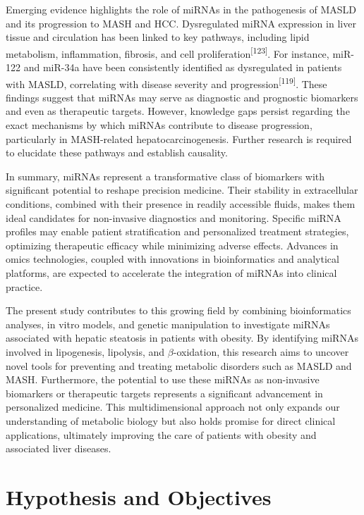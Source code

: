 \documentclass[
  11pt,
  letterpaper,
]{book}
\begin{document}
Emerging evidence highlights the role of miRNAs in the pathogenesis of
MASLD and its progression to MASH and HCC. Dysregulated miRNA expression
in liver tissue and circulation has been linked to key pathways,
including lipid metabolism, inflammation, fibrosis, and cell
proliferation\textsuperscript{{[}123{]}}. For instance, miR-122 and
miR-34a have been consistently identified as dysregulated in patients
with MASLD, correlating with disease severity and
progression\textsuperscript{{[}119{]}}. These findings suggest that
miRNAs may serve as diagnostic and prognostic biomarkers and even as
therapeutic targets. However, knowledge gaps persist regarding the exact
mechanisms by which miRNAs contribute to disease progression,
particularly in MASH-related hepatocarcinogenesis. Further research is
required to elucidate these pathways and establish causality.

In summary, miRNAs represent a transformative class of biomarkers with
significant potential to reshape precision medicine. Their stability in
extracellular conditions, combined with their presence in readily
accessible fluids, makes them ideal candidates for non-invasive
diagnostics and monitoring. Specific miRNA profiles may enable patient
stratification and personalized treatment strategies, optimizing
therapeutic efficacy while minimizing adverse effects. Advances in omics
technologies, coupled with innovations in bioinformatics and analytical
platforms, are expected to accelerate the integration of miRNAs into
clinical practice.

The present study contributes to this growing field by combining
bioinformatics analyses, in vitro models, and genetic manipulation to
investigate miRNAs associated with hepatic steatosis in patients with
obesity. By identifying miRNAs involved in lipogenesis, lipolysis, and
\(\beta\)-oxidation, this research aims to uncover novel tools for
preventing and treating metabolic disorders such as MASLD and MASH.
Furthermore, the potential to use these miRNAs as non-invasive
biomarkers or therapeutic targets represents a significant advancement
in personalized medicine. This multidimensional approach not only
expands our understanding of metabolic biology but also holds promise
for direct clinical applications, ultimately improving the care of
patients with obesity and associated liver diseases.

\chapter{Hypothesis and Objectives}\label{hypothesis-and-objectives}
\end{document}
